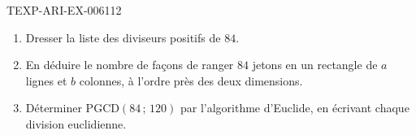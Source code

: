 \begin{exercice}{TEXP-ARI-EX-006}{1}{12}
\begin{enumerate}
  \item Dresser la liste des diviseurs positifs de $84$.
  \item En déduire le nombre de façons de ranger $84$ jetons en un rectangle
        de $a$ lignes et $b$ colonnes, à l'ordre près des deux dimensions.
  \item Déterminer $\mathrm{PGCD}(84\,;\,120)$ par l'algorithme d'Euclide, en
        écrivant chaque division euclidienne.
\end{enumerate}
\end{exercice}
